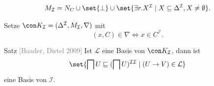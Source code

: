\documentclass[ngerman]{beamer}
\newcommand{\pseudocite}[1]{\textcolor{gray}{[#1]}}
\begin{document}
  


\begin{frame}

  \onslide<+->

  \begin{Definition}
    \begin{equation*}
      M_{\mathcal{I}} = N_{C} \cup \set{ \bot } \cup \set{ \exists r. X^{\mathcal{I}} \mid
        X \subseteq \Delta^{\mathcal{I}}, X \neq \emptyset }.
    \end{equation*}
  \end{Definition}

  \onslide<+->

  \begin{Definition}
    Setze $\con K_{\mathcal{I}} = (\Delta^{\mathcal{I}}, M_{\mathcal{I}}, \nabla)$ mit
    \begin{equation*}
      (x, C) \in \nabla \iff x \in C^{\mathcal{I}}.
    \end{equation*}
  \end{Definition}

  \onslide<+->

  \begin{block}{Satz \pseudocite{Baader, Distel 2009}}
    Ist $\mathcal{L}$ eine Basis von $\con K_{\mathcal{I}}$, dann ist
    \begin{equation*}
      \set{ \bigsqcap U \sqsubseteq (\bigsqcap U)^{\mathcal{I}\mathcal{I}} \mid (U \to V)
        \in \mathcal{L} }
    \end{equation*}
    eine Basis von $\mathcal{I}$.    
  \end{block}
  
\end{frame}
\end{document}
